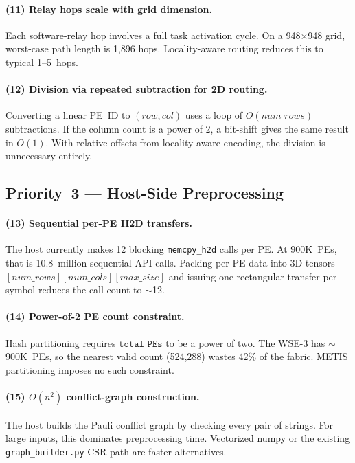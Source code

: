 \documentclass[11pt,letterpaper]{article}
\begin{document}
\paragraph{(11) Relay hops scale with grid dimension.}
Each software-relay hop involves a full task activation cycle.
On a 948$\times$948 grid, worst-case path length is 1{,}896 hops.
Locality-aware routing reduces this to typical 1--5~hops.

\paragraph{(12) Division via repeated subtraction for 2D routing.}
Converting a linear PE~ID to $(row, col)$ uses a loop
of $O(\mathit{num\_rows})$ subtractions.
If the column count is a power of 2,
a bit-shift gives the same result in $O(1)$.
With relative offsets from locality-aware encoding, the division is unnecessary entirely.

\subsection{Priority~3 --- Host-Side Preprocessing}

\paragraph{(13) Sequential per-PE H2D transfers.}
The host currently makes 12 blocking \texttt{memcpy\_h2d} calls per PE.
At 900K~PEs, that is 10.8~million sequential API calls.
Packing per-PE data into 3D tensors
$[\mathit{num\_rows}][\mathit{num\_cols}][\mathit{max\_size}]$
and issuing one rectangular transfer per symbol
reduces the call count to $\sim$12.

\paragraph{(14) Power-of-2 PE count constraint.}
Hash partitioning requires $\texttt{total\_PEs}$ to be a power of two.
The WSE-3 has $\sim$900K~PEs,
so the nearest valid count (524{,}288) wastes 42\% of the fabric.
METIS partitioning imposes no such constraint.

\paragraph{(15) $O(n^2)$ conflict-graph construction.}
The host builds the Pauli conflict graph by checking every pair of strings.
For large inputs, this dominates preprocessing time.
Vectorized numpy or the existing \texttt{graph\_builder.py} CSR path are faster alternatives.
\end{document}
